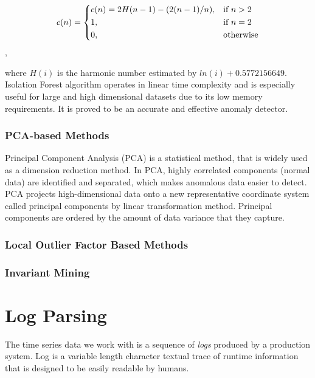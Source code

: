  \[
 c(n) = 
  \begin{dcases}
     c(n) = 2H(n - 1) - (2(n - 1) / n), & \text{if } n > 2\\
     1, & \text{if } n = 2\\
     0, & \text{otherwise}
 \end{dcases} 
 \],
 
 where $H(i)$ is the harmonic number estimated by $ln(i) + 0.5772156649$. \\
 
 Isolation Forest algorithm operates in linear time complexity and is especially useful for large and high dimensional datasets due to its low memory requirements. It is proved to be an accurate and effective anomaly detector.
 
 
 \subsubsection{PCA-based Methods}
 Principal Component Analysis (PCA) is a statistical method, that is widely used as a dimension reduction method. In PCA, highly correlated components (normal data) are identified and separated, which makes anomalous data easier to detect. PCA projects high-dimensional data onto a new representative coordinate system called principal components by linear transformation method. Principal components are ordered by the amount of data variance that they capture.

 
 \subsubsection{Local Outlier Factor Based Methods}

 \subsubsection{Invariant Mining}
\newpage

\section{Log Parsing}
The time series data we work with is a sequence of \textit{logs} produced by a production system. 
Log is a variable length character textual trace of runtime information that is designed to be easily readable by humans.

